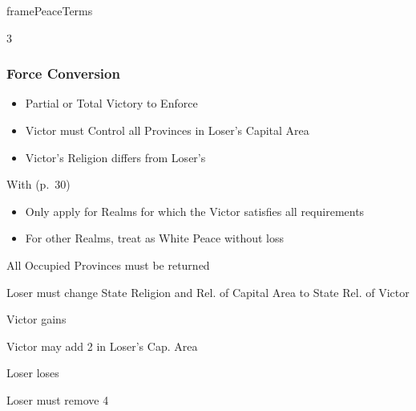 \documentclass[10pt]{article}
\newlength{\fhPeaceTerms} \setlength\fhPeaceTerms{45.5\baselineskip}
\begin{document}
\begin{dynamiccontents*}{framePeaceTerms}
\begin{eubox}{\fhPeaceTerms}
\begin{multicols}{3}
		\subsubsection*{Force Conversion }
		\begin{itemize}
			{
				\color{peaceReqColor}
				\item {}
				\begin{itemize}
					\item Partial or Total Victory to Enforce
					\item Victor must Control all Provinces in Loser's Capital Area
					\item Victor's Religion differs from Loser's
				\end{itemize}
			}
			\item With  (p.~30)
			\begin{itemize}
				\item Only apply for Realms for which the Victor satisfies all requirements
				\item For other Realms, treat as White Peace without \prestige loss
			\end{itemize}
			\item All Occupied Provinces must be returned
			\item Loser must change State Religion and Rel. of Capital Area to State Rel. of Victor
			\item Victor gains 
			\item Victor may add 2 \influence in Loser's Cap. Area
			\item Loser loses 
			\item Loser must remove 4 \influence
		\end{itemize}


\end{multicols}
\end{eubox}
\end{dynamiccontents*}
\end{document}
